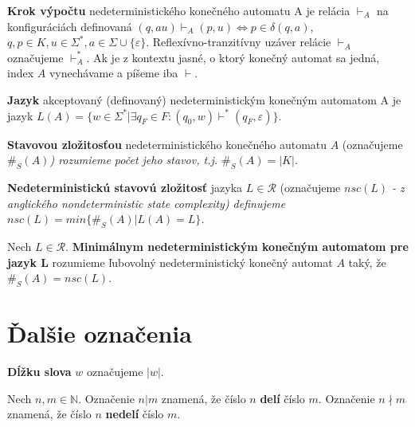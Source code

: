 \begin{definition}
\textbf{Krok výpočtu} nedeterministického konečného automatu A je relácia $ \vdash_A $ na konfiguráciách definovaná $ (q, au) \vdash_{A} (p,u) \Leftrightarrow p \in \delta(q,a) $, $q,p \in K, u \in \Sigma^*, a \in \Sigma \cup \lbrace \varepsilon \rbrace $. Reflexívno-tranzitívny uzáver relácie $ \vdash_A $ označujeme $ \vdash_{A}^{*} $. Ak je z kontextu jasné, o ktorý konečný automat sa jedná, index $ A $ vynechávame a píšeme iba $ \vdash $.
\end{definition}

\begin{definition}
\textbf{Jazyk} akceptovaný (definovaný) nedeterministickým konečným automatom A je jazyk $ L(A) = \lbrace w \in \Sigma^{*} | \exists q_F \in F: (q_0,w) \vdash^{*} (q_F, \varepsilon) \rbrace $.
\end{definition}

\begin{definition}
\textbf{Stavovou zložitosťou} nedeterministického konečného automatu $ A $ (označujeme \em{}$ \#_S(A) $\em{}) rozumieme počet jeho stavov, t.j. \em{}$ \#_S(A) = |K| $\em{}.
\end{definition}

\begin{definition}
\textbf{Nedeterministickú stavovú zložitosť} jazyka $ L \in \mathscr{R} $ (označujeme \em{}$ nsc(L) $\em{} - z anglického nondeterministic state complexity) definujeme \em{}$ nsc(L)=min \lbrace \#_S(A) | L(A)=L \rbrace $\em{}.
\end{definition}

\begin{definition}
Nech $ L \in \mathscr{R} $. \textbf{Minimálnym nedeterministickým konečným automatom pre jazyk L} rozumieme ľubovolný nedeterministický konečný automat $ A $ taký, že $ \#_S(A)=nsc(L) $.
\end{definition}

\section{Ďalšie označenia}

\begin{notation}
\textbf{Dĺžku slova} $ w $ označujeme $ |w| $.
\end{notation}

\begin{notation}
Nech $ n,m \in \mathbb{N} $. Označenie $ n|m $ znamená, že číslo $ n $ \textbf{delí} číslo $ m $. Označenie $ n \nmid m $ znamená, že číslo $ n $ \textbf{nedelí} číslo $ m $.
\end{notation}

